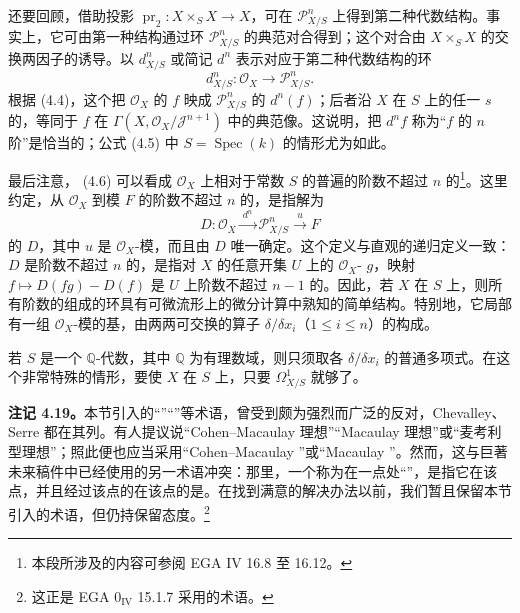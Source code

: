 还要回顾，借助投影 $\operatorname{pr}_2:X\times_S X\to X$，可在 $\mathcal P^n_{X/S}$ 上得到第二种代数结构。事实上，它可由第一种结构通过环 $\mathcal P^n_{X/S}$ 的典范对合得到；这个对合由 $X\times_S X$ 的交换两因子的诱导。以 $d^n_{X/S}$ 或简记 $d^n$ 表示对应于第二种代数结构的环
\[
d^n_{X/S}:\mathcal O_X\longrightarrow\mathcal P^n_{X/S}.\tag{4.6}
\]
根据 (4.4)，这个把 $\mathcal O_X$ 的 $f$ 映成 $\mathcal P^n_{X/S}$ 的 $d^n(f)$；后者沿 $X$ 在 $S$ 上的任一 $s$ 的，等同于 $f$ 在 $\Gamma(X,\mathcal O_X/\mathcal J^{n+1})$ 中的典范像。这说明，把 $d^n f$ 称为“$f$ 的 $n$ 阶”是恰当的；公式 (4.5) 中 $S=\operatorname{Spec}(k)$ 的情形尤为如此。

最后注意， (4.6) 可以看成 $\mathcal O_X$ 上相对于常数 $S$ 的普遍的阶数不超过 $n$ 的\footnote{本段所涉及的内容可参阅 EGA IV 16.8 至 16.12。}。这里约定，从 $\mathcal O_X$ 到模 $F$ 的阶数不超过 $n$ 的，是指解为
\[
D:\mathcal O_X\xrightarrow{\ d^n\ }\mathcal P^n_{X/S}\xrightarrow{\ u\ }F
\]
的 $D$，其中 $u$ 是 $\mathcal O_X$-模，而且由 $D$ 唯一确定。这个定义与直观的递归定义一致：$D$ 是阶数不超过 $n$ 的，是指对 $X$ 的任意开集 $U$ 上的 $\mathcal O_X$- $g$，映射 $f\mapsto D(fg)-D(f)$ 是 $U$ 上阶数不超过 $n-1$ 的。因此，若 $X$ 在 $S$ 上，则所有阶数的组成的环具有可微流形上的微分计算中熟知的简单结构。特别地，它局部有一组 $\mathcal O_X$-模的基，由两两可交换的算子 $\delta/\delta x_i$（$1\leq i\leq n$）的构成。

若 $S$ 是一个 $\mathbb Q$-代数，其中 $\mathbb Q$ 为有理数域，则只须取各 $\delta/\delta x_i$ 的普通多项式。在这个非常特殊的情形，要使 $X$ 在 $S$ 上，只要 $\Omega^1_{X/S}$ 就够了。

\textbf{注记 4.19。}本节引入的“”“”等术语，曾受到颇为强烈而广泛的反对，Chevalley、Serre 都在其列。有人提议说“Cohen--Macaulay 理想”“Macaulay 理想”或“麦考利型理想”；照此便也应当采用“Cohen--Macaulay ”或“Macaulay ”。然而，这与巨著未来稿件中已经使用的另一术语冲突：那里，一个称为在一点处“”，是指它在该点，并且经过该点的在该点的是。在找到满意的解决办法以前，我们暂且保留本节引入的术语，但仍持保留态度。\footnote{这正是 EGA $0_{\mathrm{IV}}$ 15.1.7 采用的术语。}

